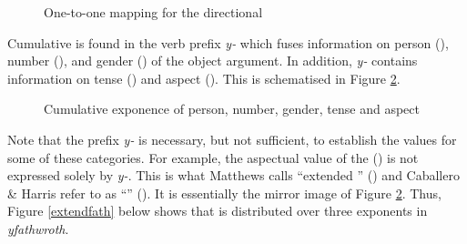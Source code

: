 \begin{figure}[H]
\begin{center}
\end{center}
\caption{One-to-one mapping for the directional}
\label{one-to-one}
\end{figure}%

Cumulative  is found in the verb prefix \emph{y-} which fuses information on person (\Third), number (\Sg), and gender (\Masc) of the object argument. In addition, \emph{y-} contains information on tense (\Nonpast) and aspect (\Ipfv{}). This is schematised in Figure \ref{cumulfath}.

\begin{figure}[H]
\begin{center}
\end{center}
\caption{Cumulative exponence of person, number, gender, tense and aspect}
\label{cumulfath}
\end{figure}%

Note that the prefix \emph{y-} is necessary, but not sufficient, to establish the values for some of these categories. For example, the aspectual value of the  (\Ipfv) is not expressed solely by \emph{y-}. This is what Matthews calls ``extended '' (\citeyear[147-149]{Matthews:1979vm}) and Caballero \& Harris refer to as ``'' (\citeyear[163]{Caballero:2012vr}). It is essentially the mirror image of Figure \ref{cumulfath}. Thus, Figure \ref{extendfath} below shows that  is distributed over three exponents in \emph{yfathwroth}.

